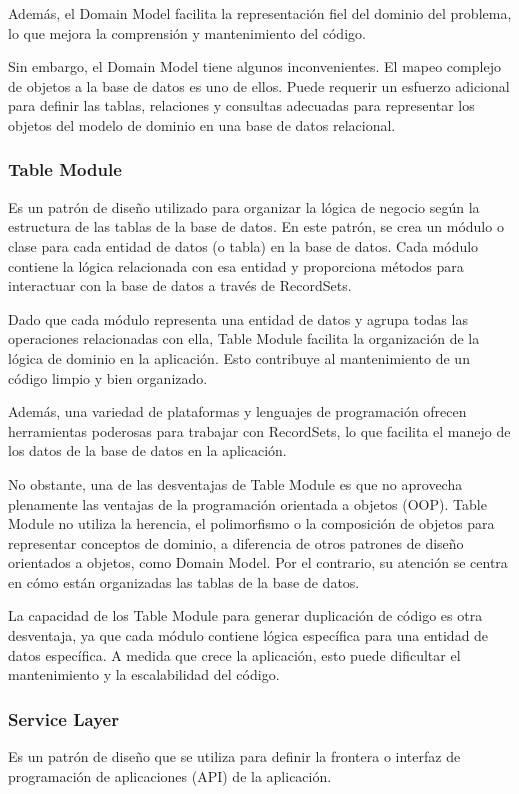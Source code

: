 \documentclass{article}
\begin{document}
		Además, el Domain Model facilita la representación fiel del dominio del problema, lo que mejora la comprensión y mantenimiento del código. 
		
		Sin embargo, el Domain Model tiene algunos inconvenientes. El mapeo complejo de objetos a la base de datos es uno de ellos. Puede requerir un esfuerzo adicional para definir las tablas, relaciones y consultas adecuadas para representar los objetos del modelo de dominio en una base de datos relacional.
		\subsubsection{Table Module}
		
		Es un patrón de diseño utilizado para organizar la lógica de negocio según la estructura de las tablas de la base de datos. En este patrón, se crea un módulo o clase para cada entidad de datos (o tabla) en la base de datos. Cada módulo contiene la lógica relacionada con esa entidad y proporciona métodos para interactuar con la base de datos a través de RecordSets.
		
		Dado que cada módulo representa una entidad de datos y agrupa todas las operaciones relacionadas con ella, Table Module facilita la organización de la lógica de dominio en la aplicación. Esto contribuye al mantenimiento de un código limpio y bien organizado.
		
		Además, una variedad de plataformas y lenguajes de programación ofrecen herramientas poderosas para trabajar con RecordSets, lo que facilita el manejo de los datos de la base de datos en la aplicación.
		
		No obstante, una de las desventajas de Table Module es que no aprovecha plenamente las ventajas de la programación orientada a objetos (OOP). Table Module no utiliza la herencia, el polimorfismo o la composición de objetos para representar conceptos de dominio, a diferencia de otros patrones de diseño orientados a objetos, como Domain Model. Por el contrario, su atención se centra en cómo están organizadas las tablas de la base de datos.
		
		La capacidad de los Table Module para generar duplicación de código es otra desventaja, ya que cada módulo contiene lógica específica para una entidad de datos específica. A medida que crece la aplicación, esto puede dificultar el mantenimiento y la escalabilidad del código.
		
		\subsubsection{Service Layer}
		Es un patrón de diseño que se utiliza para definir la frontera o interfaz de programación de aplicaciones (API) de la aplicación.
		
\end{document}
